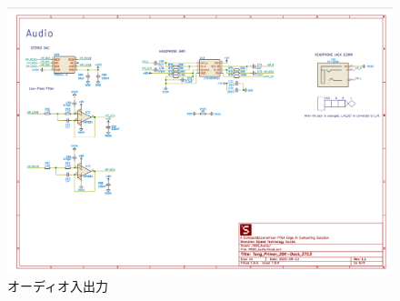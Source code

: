 \documentclass[a4paper,12pt]{article}
\begin{document}
\begin{figure}[H] %
  \centering
  \includegraphics[width=\linewidth]{audio.png}
  \caption{オーディオ入出力}
  \label{fig:audio}
\end{figure}
\end{document}
